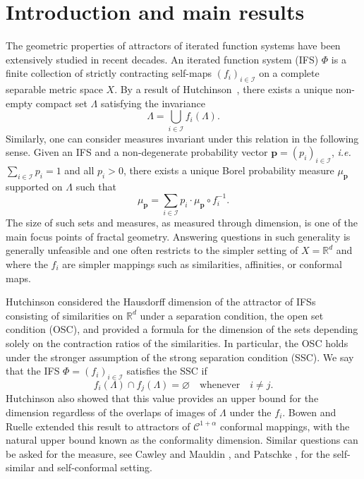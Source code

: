 \documentclass[11pt,a4paper]{article}
\theoremstyle{definition}
\theoremstyle{remark}
\newcommand{\0}{\mathbf{0}}
\newcommand{\ie}{{\it i.e.}\/ }
\numberwithin{equation}{section}
\begin{document}
\section{Introduction and main results}
The geometric properties of attractors of iterated function systems have been extensively studied in recent
decades.
An iterated function system (IFS) $\Phi$ is a finite collection of strictly contracting self-maps
$(f_i)_{i\in\mathcal{I}}$ on a complete separable metric space $X$. By a result of
Hutchinson~\cite{Hutchinson_Attractor_81}, there exists a unique non-empty compact set $\Lambda$
satisfying the
invariance
\begin{equation}\label{eq:Hutchinson}
  \Lambda = \bigcup_{i\in\mathcal{I}} f_i(\Lambda).
\end{equation}
Similarly, one can consider measures invariant under this relation in the following sense.
Given an IFS and a non-degenerate probability vector $\mathbf{p}=(p_i)_{i\in\mathcal{I}}$, \ie
$\sum_{i\in\mathcal{I}}p_i=1$ and all $p_i>0$, there exists a unique Borel probability measure
$\mu_{\mathbf{p}}$ supported on $\Lambda$ such that
\begin{equation}\label{eq:conformaMeasure}
\mu_{\mathbf{p}}=\sum_{i \in \mathcal{I}} p_i \cdot \mu_{\mathbf{p}} \circ f_i^{-1}.
\end{equation}
The size of such sets and measures, as measured through dimension, is one of the main focus points of fractal
geometry. Answering questions in such generality is generally unfeasible and one often restricts to
the simpler setting of $X=\mathbb{R}^d$ and where the $f_i$ are simpler mappings such as
similarities, affinities, or conformal maps.

Hutchinson \cite{Hutchinson_Attractor_81} considered the Hausdorff dimension of the attractor of
IFSs consisting of similarities on $\mathbb{R}^d$ under a separation condition, the open set
condition (OSC), and provided a formula for the dimension of the sets depending solely on the
contraction ratios of the similarities. In particular, the OSC holds under the stronger assumption
of the strong separation condition (SSC). We say that the IFS $\Phi=(f_i)_{i\in \mathcal{I}}$
satisfies the SSC if
\begin{equation*}%
  f_i(\Lambda)\cap f_j(\Lambda) = \varnothing\quad\text{whenever}\quad i\neq j.
\end{equation*}
Hutchinson also showed that this value provides an upper bound for
the dimension regardless of the overlaps of images of $\Lambda$ under the $f_i$.  Bowen
\cite{Bowen75} and Ruelle \cite{Ruelle2004} extended this result to attractors of
$\mathcal{C}^{1+\alpha}$ conformal mappings, with the natural upper bound known as the conformality
dimension. Similar questions can be asked for the measure, see Cawley and Mauldin
\cite{CawleyMauldin92}, and Patschke \cite{Patzschke97}, for the self-similar and self-conformal
setting. 
\end{document}
